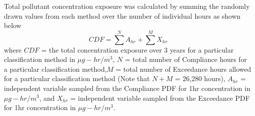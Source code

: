 %
Total pollutant concentration exposure was calculated by summing the randomly drawn values from each method over the number of individual hours as shown below
%
\begin{equation}
\label{eq3:cdfsum}
CDF=\sum^{N}A_{hr} + \sum^{M}X_{hr}
\end{equation}
%
\noindent
where     $CDF$ = the total concentration exposure over 3 years for a particular classification method in $\mu g-hr/m^{3}$, $N$ = total number of Compliance hours for a particular classification method,$M$ = total number of Exceedance hours allowed for a particular classification method (Note that $N + M$ = 26,280 hours), $A_{hr}$ = independent variable sampled from the Compliance PDF for 1hr concentration in $\mu g-hr/m^{3}$, and $X_{hr}$ = independent variable sampled from the Exceedance PDF for 1hr concentration in $\mu g-hr/m^{3}$.

